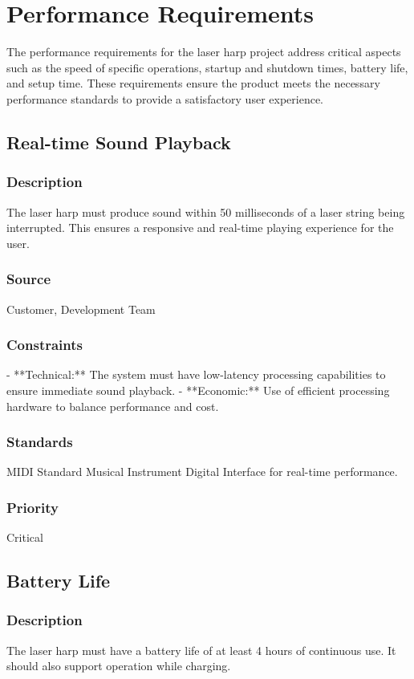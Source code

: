 \section{Performance Requirements}

The performance requirements for the laser harp project address critical aspects such as the speed of specific operations, startup and shutdown times, battery life, and setup time. These requirements ensure the product meets the necessary performance standards to provide a satisfactory user experience.

\subsection{Real-time Sound Playback}
\subsubsection{Description}
The laser harp must produce sound within 50 milliseconds of a laser string being interrupted. This ensures a responsive and real-time playing experience for the user.
\subsubsection{Source}
Customer, Development Team
\subsubsection{Constraints}
- **Technical:** The system must have low-latency processing capabilities to ensure immediate sound playback.
- **Economic:** Use of efficient processing hardware to balance performance and cost.
\subsubsection{Standards}
MIDI Standard Musical Instrument Digital Interface for real-time performance.
\subsubsection{Priority}
Critical


\subsection{Battery Life}
\subsubsection{Description}
The laser harp must have a battery life of at least 4 hours of continuous use. It should also support operation while charging.
